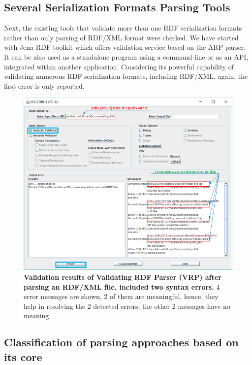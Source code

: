 \subsection{Several Serialization Formats  Parsing Tools}

\par Next, the existing tools that validate more than one  RDF serialization formats rather than only parsing of RDF/XML format were checked. We have started with Jena RDF toolkit \cite{McBride:2002:JSW:613357.613755} which offers validation service based on the ARP parser. It can  be also used as a standalone program using a command-line  or as an API, integrated within another application. Considering its powerful capability of validating numerous RDF serialization formats, including RDF/XML, again, the first error is only reported.
 \begin{figure}[ht]
		\begin{center}
			\setlength\belowcaptionskip{-10mm}
			\includegraphics[scale=0.7,angle=0]{images/VRPErrorResult.png}
			\caption{\textbf{Validation results of Validating RDF Parser (VRP) \cite{karsten:Thesis:2000} after parsing an RDF/XML file, included two syntax errors.} 4 error messages are shown, 2 of them are meaningful, hence, they help in resolving the 2 detected errors, the other 2 messages have no meaning}
			\label{Fig:VRPErrorResult}
		\end{center}
	\end{figure}
\subsection{Classification of parsing approaches based on its core}

